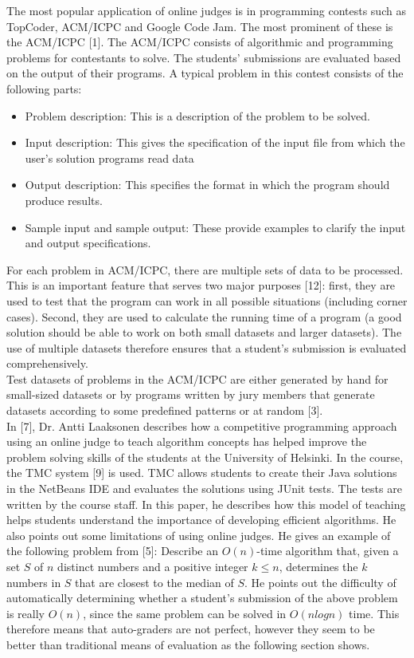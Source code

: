 \documentclass[11pt]{article}
\begin{document}
		The most popular application of online judges is in programming contests such as TopCoder,
	ACM/ICPC and Google Code Jam. The most prominent of these is the ACM/ICPC [1]. The
	ACM/ICPC consists of algorithmic and programming problems for contestants to solve. The
	students’ submissions are evaluated based on the output of their programs. A typical problem in
	this contest consists of the following parts:
		\begin{itemize}
			\item Problem description: This is a description of the problem to be solved.
			\item  Input description: This gives the specification of the input file from which the user’s
				solution programs read data
			\item Output description: This specifies the format in which the program should produce
				results.
			\item Sample input and sample output: These provide examples to clarify the input and output
				specifications.
		\end{itemize}

		For each problem in ACM/ICPC, there are multiple sets of data to be processed. This is an
	important feature that serves two major purposes [12]: first, they are used to test that the program
	can work in all possible situations (including corner cases). Second, they are used to calculate the
	running time of a program (a good solution should be able to work on both small datasets and
	larger datasets). The use of multiple datasets therefore ensures that a student’s submission is
	evaluated comprehensively. \\
	Test datasets of problems in the ACM/ICPC are either generated by hand for small-sized datasets
	or by programs written by jury members that generate datasets according to some predefined
	patterns or at random [3].\\
	In [7], Dr. Antti Laaksonen describes how a competitive programming approach using an online
	judge to teach algorithm concepts has helped improve the problem solving skills of the students at the University of Helsinki. In 		the course, the TMC system [9] is used. TMC allows students to
	create their Java solutions in the NetBeans IDE and evaluates the solutions using JUnit tests. The
	tests are written by the course staff. In this paper, he describes how this model of teaching helps
	students understand the importance of developing efficient algorithms. He also points out some
	limitations of using online judges. He gives an example of the following problem from [5]:
	Describe an $O(n)$-time algorithm that, given a set $S$ of $𝑛$ distinct numbers and a positive
	integer $k ≤ n$, determines the $k$ numbers in $S$ that are closest to the median of $S$.
	He points out the difficulty of automatically determining whether a student’s submission of the
	above problem is really $O(n)$, since the same problem can be solved in $O(n log n)$ time. This
	therefore means that auto-graders are not perfect, however they seem to be better than traditional
	means of evaluation as the following section shows.
\end{document}
